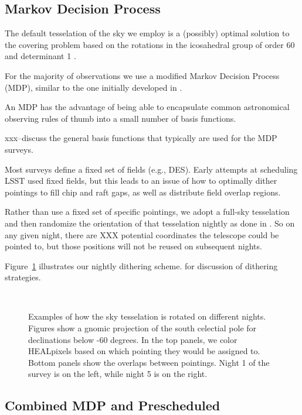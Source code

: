 \documentclass[]{aastex631}
\begin{document}
\subsection{Markov Decision Process}

The default tesselation of the sky we employ is a (possibly) optimal solution to the covering problem based on the rotations in the icosahedral group of order 60 and determinant 1 \citep{Hardin94}.  

For the majority of observations we use a modified Markov Decision Process (MDP), similar to the one initially developed in \citet{Naghib2019}.

An MDP has the advantage of being able to encapsulate common astronomical observing rules of thumb into a small number of basis functions. 

xxx--discuss the general basis functions that typically are used for the MDP surveys. 


Most surveys define a fixed set of fields (e.g., DES). Early attempts at scheduling LSST used fixed fields, but this leads to an issue of how to optimally dither pointings to fill chip and raft gaps, as well as distribute field overlap regions. 

Rather than use a fixed set of specific pointings, we adopt a full-sky tesselation and then randomize the orientation of that tesselation nightly as done in \citet{Rothchild2019}. So on any given night, there are XXX potential coordinates the telescope could be pointed to, but those positions will not be reused on subsequent nights.

Figure~\ref{fig:tesselation} illustrates our nightly dithering scheme. \citet{Awan2016} for discussion of dithering strategies. 

\begin{figure}
     \\
    \caption{Examples of how the sky tesselation is rotated on different nights. Figures show a gnomic projection of the south celectial pole for declinations below -60 degrees. In the top panels, we color HEALpixels based on which pointing they would be assigned to. Bottom panels show the overlaps between pointings. Night 1 of the survey is on the left, while night 5 is on the right. \label{fig:tesselation}}
\end{figure}

\subsection{Combined MDP and Prescheduled}
\end{document}
